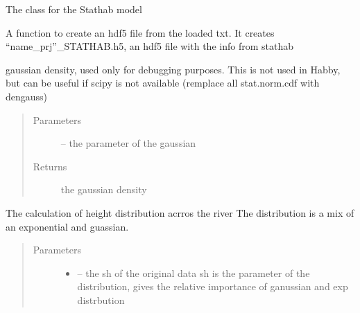 \documentclass[letterpaper,10pt,english]{sphinxmanual}
\begin{document}
\begin{fulllineitems}
\label{\detokenize{index:src.stathab_c.Stathab}}
The class for the Stathab model

\begin{fulllineitems}
\label{\detokenize{index:src.stathab_c.Stathab.create_hdf5}}
A function to create an hdf5 file from the loaded txt. It creates ``name\_prj''\_STATHAB.h5, an hdf5 file with the
info from stathab

\end{fulllineitems}


\begin{fulllineitems}
\label{\detokenize{index:src.stathab_c.Stathab.dengauss}}
gaussian density, used only for debugging purposes.
This is not used in Habby, but can be useful if scipy is not available (remplace all stat.norm.cdf with
dengauss)
\begin{quote}\begin{description}
\item[{Parameters}] \leavevmode
{} -- the parameter of the gaussian

\item[{Returns}] \leavevmode
the gaussian density

\end{description}\end{quote}

\end{fulllineitems}


\begin{fulllineitems}
\label{\detokenize{index:src.stathab_c.Stathab.dist_h}}
The calculation of height distribution  acrros the river
The distribution is a mix of an exponential and guassian.
\begin{quote}\begin{description}
\item[{Parameters}] \leavevmode\begin{itemize}
\item {} 
 -- the sh of the original data
sh is the parameter of the distribution, gives the relative importance of ganussian and exp distrbution


\end{itemize}
\end{description}
\end{quote}
\end{fulllineitems}
\end{fulllineitems}
\end{document}
